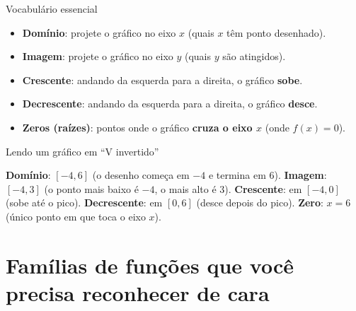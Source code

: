 \documentclass[12pt,a4paper]{article}
\begin{document}
\begin{dica}{Vocabulário essencial}
\begin{itemize}[nosep]
  \item \textbf{Domínio}: projete o gráfico no eixo $x$ (quais $x$ têm ponto desenhado).
  \item \textbf{Imagem}: projete o gráfico no eixo $y$ (quais $y$ são atingidos).
  \item \textbf{Crescente}: andando da esquerda para a direita, o gráfico \textbf{sobe}.
  \item \textbf{Decrescente}: andando da esquerda para a direita, o gráfico \textbf{desce}.
  \item \textbf{Zeros (raízes)}: pontos onde o gráfico \textbf{cruza o eixo $x$} (onde $f(x)=0$).
\end{itemize}
\end{dica}

\begin{exemplo}{Lendo um gráfico em ``V invertido''}
\begin{center}
\end{center}
\textbf{Domínio}: $[-4,6]$ (o desenho começa em $-4$ e termina em $6$).
\textbf{Imagem}: $[-4,3]$ (o ponto mais baixo é $-4$, o mais alto é $3$).
\textbf{Crescente}: em $[-4,0]$ (sobe até o pico). \textbf{Decrescente}:
em $[0,6]$ (desce depois do pico). \textbf{Zero}: $x=6$ (único ponto em
que toca o eixo $x$).
\end{exemplo}

\section{Famílias de funções que você precisa reconhecer de cara}

\begin{center}
\hfill
{}
\end{center}
\end{document}
